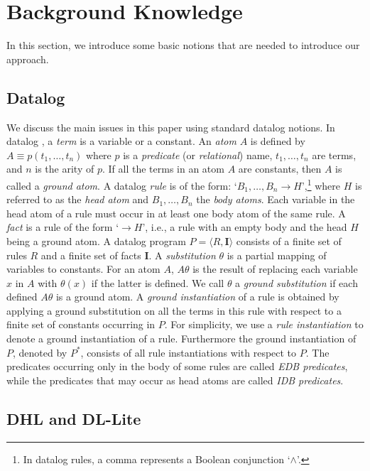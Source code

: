 \section{Background Knowledge}
\label{sec:background}

In this section, we introduce some basic notions that are needed to introduce our approach.


\subsection{Datalog}

We discuss the main issues in this paper using standard datalog notions.
In datalog \cite{database}, a \emph{term} is a variable or a constant. An \emph{atom} $A$
is defined by $A\equiv p(t_1,\ldots,t_n)$ where $p$ is a \emph{predicate} (or \emph{relational})
name, $t_1,\ldots,t_n$ are terms, and $n$ is the arity of $p$. If all the terms in an atom $A$ are
constants, then $A$ is called a \emph{ground atom}.
A datalog \emph{rule} is of the form: `$B_1,\ldots,B_n\rightarrow H$',\footnote{In datalog rules, a comma
represents a Boolean conjunction `$\wedge$'.} where $H$ is referred to as
the \emph{head atom} and $B_1,\ldots,B_n$ the \emph{body atoms}. Each variable in the head atom
of a rule must occur in at least one body atom of the same rule. A \emph{fact} is a rule of
the form `$\rightarrow H$', i.e., a rule with an empty body and the head $H$ being a ground atom.
A datalog program  $P=\langle R, \textbf{I}\rangle$ consists of a
finite set of rules $R$ and a finite set of facts $\textbf{I}$.
A \emph{substitution} $\theta$ is a partial mapping of variables to constants.
For an atom $A$, $A\theta$ is the result of replacing each variable $x$ in $A$
with $\theta(x)$ if the latter is defined. We call $\theta$ a \emph{ground substitution}
if each defined $A\theta$ is a ground atom.
A \emph{ground instantiation} of a rule is obtained by applying a ground substitution on all
the terms in this rule with respect to a finite set of constants occurring in $P$.
For simplicity, we use a \emph{rule instantiation} to denote a ground instantiation of a rule.
Furthermore the ground instantiation of $P$, denoted by $P^*$,
consists of all rule instantiations with respect to $P$.
The predicates occurring only in the body  of some rules are called \emph{EDB predicates},
while the predicates that may occur as head atoms are called \emph{IDB predicates}.


\subsection{DHL and DL-Lite}

